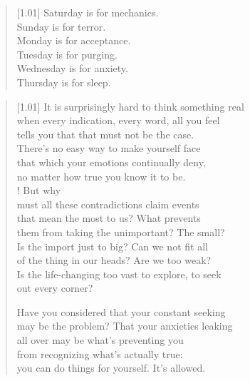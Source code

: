 \label{gender:surgery}
\null
\vfill
\begin{verse}[1.01\textwidth]
  Saturday is for mechanics.\\
  Sunday is for terror.\\
  Monday is for acceptance.\\
  Tuesday is for purging.\\
  Wednesday is for anxiety.\\
  Thursday is for sleep.
\end{verse}
\vfill

\newpage

\begin{verse}[1.01\textwidth]
  It is surprisingly hard to think something real\\
  when every indication, every word, all you feel\\
  tells you that that must not be the case.\\
  There's no easy way to make yourself face\\
  that which your emotions continually deny,\\
  no matter how true you know it to be.\\!
   But why\\
  must all these contradictions claim events\\
  that mean the most to us? What prevents\\
  them from taking the unimportant? The small?\\
  Is the import just to big? Can we not fit all\\
  of the thing in our heads? Are we too weak?\\
  Is the life-changing too vast to explore, to seek\\
  out every corner?

\begin{ally}
  \noindent Have you considered that your constant seeking\\
  \noindent may be the problem? That your anxieties leaking\\
  \noindent all over may be what's preventing you\\
  \noindent from recognizing what's actually true:\\
  \noindent you can do things for yourself. It's allowed.
\end{ally}


\end{verse}
